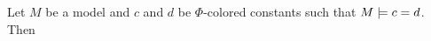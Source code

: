 \begin{comment}
\begin{lemma}
	Let $s$ and $t$ be terms such that no $x_i$ occurs in them, $\Phi$ a set of formulas and $M$ a model.
	Then $M\entails \lft{\Phi}{x}{s} = \lft{\Phi}{x}{t}$ implies that $M\entails s=t$.
	\label{lemma:lift_equality}
\end{lemma}
\begin{proof}
	Suppose no $\Delta$-term occurs in $s$ or $t$. Then $\lft{\Phi}{x}{s} = s$ 
	and $\lft{\Phi}{x}{t} = t$.

	Otherwise let $t_i$ be a maximal $\Delta$-term in $s$. Suppose it occurs at position $p$. In $\lft{\Phi}{x}{s}$, it is replaced by $x_i$.
	But as $M \entails \lft{\Phi}{x}{s} = \lft{\Phi}{x}{t}$, two situations can arise:
	\begin{compactenum}
	\item $x_i$ occurs at $p$ in $\lft{\Phi}{x}{t}$.
		As $x_i$ does not occur in $t$, it is placed there by the lifting.
		But $x_i$ is only employed in order to replace $t_i$, so at position $p$ in $t$, we have $t_i$.
	\item A term $r$ occurs at $p$ in $\lft{\Phi}{x}{t}$ which does not influence the evaluation of $\lft{\Phi}{x}{t}$ in $M$. This can be the case if $r$ is contained in a subterm of $u$ and in $M$, the function symbol of $u$ is interpreted such that it does not depend on the argument that contains $r$.
		
		But as the maximal $\Delta$-term $t_i$ occurs in $s$ at $p$ and $M \entails \lft{\Phi}{x}{s} = \lft{\Phi}{x}{t}$, there is a function symbol $u'$ in $\lft{\Phi}{x}{s}$ corresponding to $u$ which also does not depend on this argument.

		Hence even though $s$ and $t$ are not syntactically equal, $M\entails s=t$ in this case. \qedhere
	\end{compactenum}

\end{proof}
\end{comment}


\begin{exa}
	Let $M$ be a model and $c$ and $d$ be $\Phi$-colored constants such that $M\models c=d$.  
	Then 
\end{exa}


